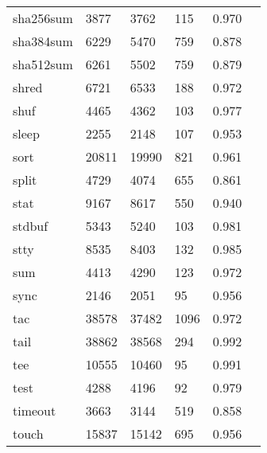 \begin{longtable}{lp{2.20cm}p{2.20cm}p{2.20cm}p{2.20cm}p{2.20cm}}
sha256sum &                     3877 &         3762 &           115 &                    0.970 \\
sha384sum &                     6229 &         5470 &           759 &                    0.878 \\
sha512sum &                     6261 &         5502 &           759 &                    0.879 \\
shred     &                     6721 &         6533 &           188 &                    0.972 \\
shuf      &                     4465 &         4362 &           103 &                    0.977 \\
sleep     &                     2255 &         2148 &           107 &                    0.953 \\
sort      &                    20811 &        19990 &           821 &                    0.961 \\
split     &                     4729 &         4074 &           655 &                    0.861 \\
stat      &                     9167 &         8617 &           550 &                    0.940 \\
stdbuf    &                     5343 &         5240 &           103 &                    0.981 \\
stty      &                     8535 &         8403 &           132 &                    0.985 \\
sum       &                     4413 &         4290 &           123 &                    0.972 \\
sync      &                     2146 &         2051 &            95 &                    0.956 \\
tac       &                    38578 &        37482 &          1096 &                    0.972 \\
tail      &                    38862 &        38568 &           294 &                    0.992 \\
tee       &                    10555 &        10460 &            95 &                    0.991 \\
test      &                     4288 &         4196 &            92 &                    0.979 \\
timeout   &                     3663 &         3144 &           519 &                    0.858 \\
touch     &                    15837 &        15142 &           695 &                    0.956 \\

\end{longtable}
